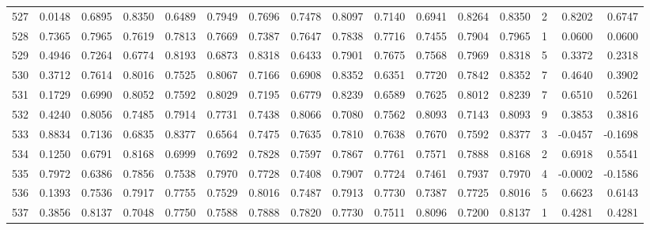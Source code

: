 \begin{tabular}{lrrrrrrrrrrrrrrr}
527 &      0.0148 &  0.6895 &  0.8350 &  0.6489 &  0.7949 &  0.7696 &  0.7478 &  0.8097 &  0.7140 &  0.6941 &   0.8264 &     0.8350 &      2 &                    0.8202 &                     0.6747 \\
528 &      0.7365 &  0.7965 &  0.7619 &  0.7813 &  0.7669 &  0.7387 &  0.7647 &  0.7838 &  0.7716 &  0.7455 &   0.7904 &     0.7965 &      1 &                    0.0600 &                     0.0600 \\
529 &      0.4946 &  0.7264 &  0.6774 &  0.8193 &  0.6873 &  0.8318 &  0.6433 &  0.7901 &  0.7675 &  0.7568 &   0.7969 &     0.8318 &      5 &                    0.3372 &                     0.2318 \\
530 &      0.3712 &  0.7614 &  0.8016 &  0.7525 &  0.8067 &  0.7166 &  0.6908 &  0.8352 &  0.6351 &  0.7720 &   0.7842 &     0.8352 &      7 &                    0.4640 &                     0.3902 \\
531 &      0.1729 &  0.6990 &  0.8052 &  0.7592 &  0.8029 &  0.7195 &  0.6779 &  0.8239 &  0.6589 &  0.7625 &   0.8012 &     0.8239 &      7 &                    0.6510 &                     0.5261 \\
532 &      0.4240 &  0.8056 &  0.7485 &  0.7914 &  0.7731 &  0.7438 &  0.8066 &  0.7080 &  0.7562 &  0.8093 &   0.7143 &     0.8093 &      9 &                    0.3853 &                     0.3816 \\
533 &      0.8834 &  0.7136 &  0.6835 &  0.8377 &  0.6564 &  0.7475 &  0.7635 &  0.7810 &  0.7638 &  0.7670 &   0.7592 &     0.8377 &      3 &                   -0.0457 &                    -0.1698 \\
534 &      0.1250 &  0.6791 &  0.8168 &  0.6999 &  0.7692 &  0.7828 &  0.7597 &  0.7867 &  0.7761 &  0.7571 &   0.7888 &     0.8168 &      2 &                    0.6918 &                     0.5541 \\
535 &      0.7972 &  0.6386 &  0.7856 &  0.7538 &  0.7970 &  0.7728 &  0.7408 &  0.7907 &  0.7724 &  0.7461 &   0.7937 &     0.7970 &      4 &                   -0.0002 &                    -0.1586 \\
536 &      0.1393 &  0.7536 &  0.7917 &  0.7755 &  0.7529 &  0.8016 &  0.7487 &  0.7913 &  0.7730 &  0.7387 &   0.7725 &     0.8016 &      5 &                    0.6623 &                     0.6143 \\
537 &      0.3856 &  0.8137 &  0.7048 &  0.7750 &  0.7588 &  0.7888 &  0.7820 &  0.7730 &  0.7511 &  0.8096 &   0.7200 &     0.8137 &      1 &                    0.4281 &                     0.4281 \\

\end{tabular}
